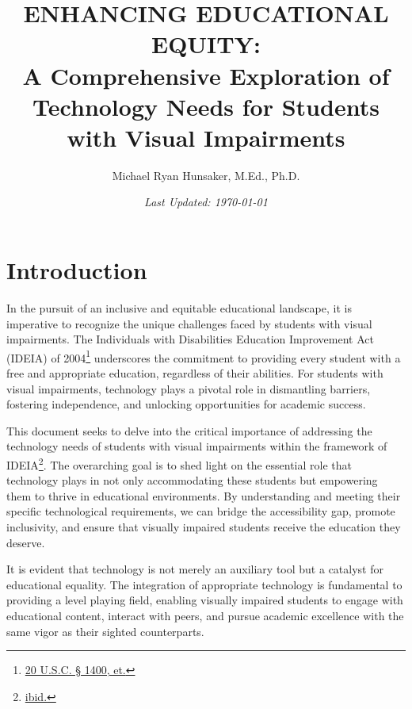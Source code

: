 \documentclass[14pt,letterpaper,twoside]{extreport}
\title{\Huge ENHANCING EDUCATIONAL EQUITY: \\ \LARGE A Comprehensive Exploration of Technology Needs for Students with Visual Impairments}
\author{Michael Ryan Hunsaker, M.Ed., Ph.D.}
\date{\vfill \textit{Last Updated: {\today}}}
\begin{document}
\maketitle
{}
\setcounter{tocdepth}{3}
\cleardoublepage
{}
\tableofcontents
{\listoffigures\let\clearpage\relax\vskip10pt\listoftables}
\newpage{}
\fancyhead{}
\fancyfoot{}


\hypertarget{intro}{\chapter*{Introduction}\label{intro} }
\pagestyle{fancyplain}       
\fancyfoot[C]{\thepage}
In the pursuit of an inclusive and equitable educational landscape, it is imperative to recognize the unique challenges faced by students with visual impairments. The Individuals with Disabilities Education Improvement Act (IDEIA) of 2004\footnote{\href{https://sites.ed.gov/idea/statuteregulations/}{20 U.S.C. § 1400, et.}} underscores the commitment to providing every student with a free and appropriate education, regardless of their abilities. For students with visual impairments, technology plays a pivotal role in dismantling barriers, fostering independence, and unlocking opportunities for academic success.

This document seeks to delve into the critical importance of addressing the technology needs of students with visual impairments within the framework of IDEIA\footnote{\href{https://sites.ed.gov/idea/statuteregulations/}{ibid.}}. The overarching goal is to shed light on the essential role that technology plays in not only accommodating these students but empowering them to thrive in educational environments. By understanding and meeting their specific technological requirements, we can bridge the accessibility gap, promote inclusivity, and ensure that visually impaired students receive the education they deserve.

It is evident that technology is not merely an auxiliary tool but a catalyst for educational equality. The integration of appropriate technology is fundamental to providing a level playing field, enabling visually impaired students to engage with educational content, interact with peers, and pursue academic excellence with the same vigor as their sighted counterparts.
\end{document}
